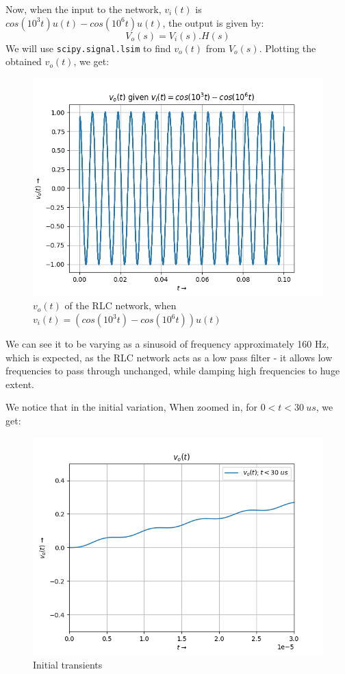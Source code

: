 \documentclass[11pt, a4paper]{article}
\begin{document}
    Now, when the input to the network, $v_i(t)$ is $cos(10^3t)u(t)-cos(10^6t)u(t)$, the output is given by:
    \begin{equation*}
        V_o(s) = V_i(s).H(s)
    \end{equation*}
    We will use \texttt{scipy.signal.lsim} to find $v_o(t)$ from $V_o(s)$.
    Plotting the obtained $v_o(t)$, we get:
    \begin{figure}[H]
        \centering
        \includegraphics[scale=0.7]{Figure_7.png}
        \caption{$v_o(t)$ of the RLC network, when $v_i(t) = (cos(10^3t)-cos(10^6t))u(t)$}
        \label{fig:Fig6a}
    \end{figure}

    We can see it to be varying as a sinusoid of frequency approximately 160 Hz, which is expected, as the RLC network acts as a low pass filter - it allows low frequencies to pass through unchanged, while damping high frequencies to huge extent. 

    We notice that in the initial variation, When zoomed in, for $0<t<30\ us$, we get:
    \begin{figure}[H]
        \centering
        \includegraphics[scale=0.7]{Figure_8.png}
        \caption{Initial transients}
        \label{fig:Fig6b}
    \end{figure}
\end{document}
